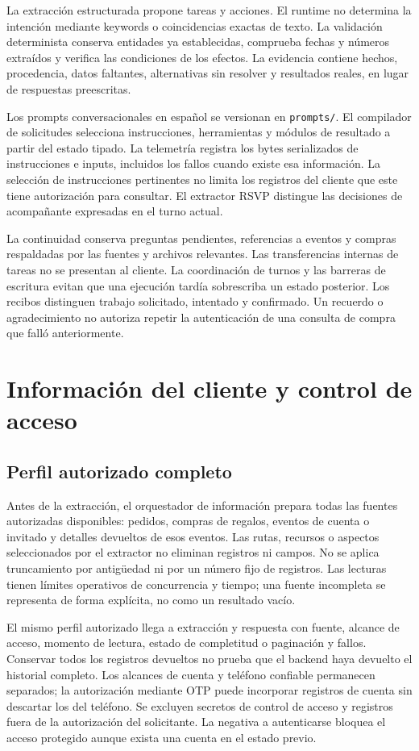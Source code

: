 \documentclass[
	a4paper,
	12pt,
]{CSSullivanBusinessReport}
\begin{document}
La extracción estructurada propone tareas y acciones. El runtime no determina la intención mediante keywords o coincidencias exactas de texto. La validación determinista conserva entidades ya establecidas, comprueba fechas y números extraídos y verifica las condiciones de los efectos. La evidencia contiene hechos, procedencia, datos faltantes, alternativas sin resolver y resultados reales, en lugar de respuestas preescritas.

Los prompts conversacionales en español se versionan en \texttt{prompts/}. El compilador de solicitudes selecciona instrucciones, herramientas y módulos de resultado a partir del estado tipado. La telemetría registra los bytes serializados de instrucciones e inputs, incluidos los fallos cuando existe esa información. La selección de instrucciones pertinentes no limita los registros del cliente que este tiene autorización para consultar. El extractor RSVP distingue las decisiones de acompañante expresadas en el turno actual.

La continuidad conserva preguntas pendientes, referencias a eventos y compras respaldadas por las fuentes y archivos relevantes. Las transferencias internas de tareas no se presentan al cliente. La coordinación de turnos y las barreras de escritura evitan que una ejecución tardía sobrescriba un estado posterior. Los recibos distinguen trabajo solicitado, intentado y confirmado. Un recuerdo o agradecimiento no autoriza repetir la autenticación de una consulta de compra que falló anteriormente.

\section{Información del cliente y control de acceso}
\subsection{Perfil autorizado completo}
Antes de la extracción, el orquestador de información prepara todas las fuentes autorizadas disponibles: pedidos, compras de regalos, eventos de cuenta o invitado y detalles devueltos de esos eventos. Las rutas, recursos o aspectos seleccionados por el extractor no eliminan registros ni campos. No se aplica truncamiento por antigüedad ni por un número fijo de registros. Las lecturas tienen límites operativos de concurrencia y tiempo; una fuente incompleta se representa de forma explícita, no como un resultado vacío.

El mismo perfil autorizado llega a extracción y respuesta con fuente, alcance de acceso, momento de lectura, estado de completitud o paginación y fallos. Conservar todos los registros devueltos no prueba que el backend haya devuelto el historial completo. Los alcances de cuenta y teléfono confiable permanecen separados; la autorización mediante OTP puede incorporar registros de cuenta sin descartar los del teléfono. Se excluyen secretos de control de acceso y registros fuera de la autorización del solicitante. La negativa a autenticarse bloquea el acceso protegido aunque exista una cuenta en el estado previo.
\end{document}

